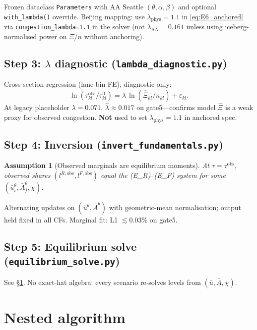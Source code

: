 \documentclass[12pt]{article}
\newtheorem{assumption}{Assumption}
\newcommand{\ubar}{\bar u}
\newcommand{\Abar}{\bar A}
\newcommand{\obs}{\mathrm{obs}}
\newcommand{\ff}{\mathrm{ff}}
\begin{document}
Frozen dataclass \texttt{Parameters} with AA Seattle $(\theta,\alpha,\beta)$ and
optional \texttt{with\_lambda()} override.
Beijing mapping: use $\lambda_{\mathrm{phys}}=1.1$ in \eqref{eq:E6_anchored}
via \texttt{congestion\_lambda=1.1} in the solver (not $\lambda_{\mathrm{AA}}=0.161$
unless using iceberg-normalised power on $\Xi/n$ without anchoring).

\subsection{Step 3: $\lambda$ diagnostic (\texttt{lambda\_diagnostic.py})}

Cross-section regression (lane-bin FE), diagnostic only:
\begin{equation}
  \ln(\tau^{\obs}_{kl}/\tau^{\ff}_{kl})
  = \lambda\,\ln(\hat\Xi_{kl}/n_{kl}) + \varepsilon_{kl}.
\end{equation}
At legacy placeholder $\lambda=0.071$, $\hat\lambda\approx 0.017$ on gate5---confirms
model $\hat\Xi$ is a weak proxy for observed congestion.
\textbf{Not} used to set $\lambda_{\mathrm{phys}}=1.1$ in anchored spec.

\subsection{Step 4: Inversion (\texttt{invert\_fundamentals.py})}

\begin{assumption}[Observed marginals are equilibrium moments]
\label{ass:marginals}
At $\tau=\tau^{\obs}$, observed shares $(l^{R,\obs},l^{F,\obs})$ equal the
(E\_R)--(E\_F) system for some $(\ubar_i^{\theta},\Abar_j^{\theta},\chi)$.
\end{assumption}
Alternating updates on $(\ubar^{\theta},\Abar^{\theta})$ with geometric-mean
normalisation; output held fixed in all CFs.
Marginal fit: L1 $\lesssim 0.03\%$ on gate5.

\subsection{Step 5: Equilibrium solve (\texttt{equilibrium\_solve.py})}

See §\ref{sec:algorithm}.
No exact-hat algebra: every scenario re-solves levels from $(\ubar,\Abar,\chi)$.

\section{Nested algorithm}\label{sec:algorithm}
\end{document}
